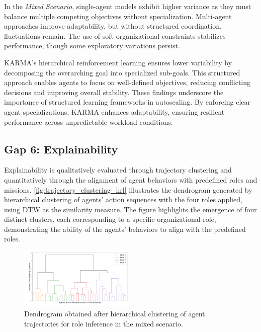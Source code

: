 \documentclass[conference]{IEEEtran}
\begin{document}
In the \textit{Mixed Scenario}, single-agent models exhibit higher variance as they must balance multiple competing objectives without specialization. Multi-agent approaches improve adaptability, but without structured coordination, fluctuations remain. The use of soft organizational constraints stabilizes performance, though some exploratory variations persist.

KARMA's hierarchical reinforcement learning ensures lower variability by decomposing the overarching goal into specialized sub-goals. This structured approach enables agents to focus on well-defined objectives, reducing conflicting decisions and improving overall stability.
%
These findings underscore the importance of structured learning frameworks in autoscaling. By enforcing clear agent specializations, KARMA enhances adaptability, ensuring resilient performance across unpredictable workload conditions.


\subsection{Gap 6: Explainability}
\label{subsec:gap_explainability}

Explainability is qualitatively evaluated through trajectory clustering and quantitatively through the alignment of agent behaviors with predefined roles and missions.
\noindent \autoref{fig:trajectory_clustering_hrl} illustrates the dendrogram generated by hierarchical clustering of agents' action sequences with the four roles applied, using DTW as the similarity measure. The figure highlights the emergence of four distinct clusters, each corresponding to a specific organizational role, demonstrating the ability of the agents' behaviors to align with the predefined roles.

\begin{figure}[h!]
    \centering
    \includegraphics[width=0.49\textwidth]{figures/role_hierarchical_clustering.pdf}
    \caption{Dendrogram obtained after hierarchical clustering of agent trajectories for role inference in the mixed scenario.}
    \label{fig:trajectory_clustering_hrl}
\end{figure}
\end{document}
